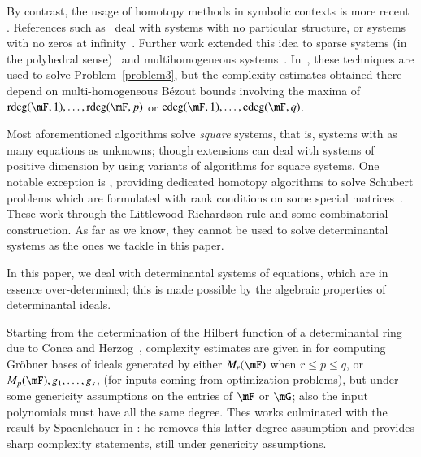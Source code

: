 By contrast, the usage of homotopy methods in symbolic contexts is
more recent%
. References such
as~\cite{HeKrPuSaWa99,BoMaWaWa04} deal with systems with no particular
structure, or systems with no zeros at infinity~\cite{PaSa04}.
Further work extended this idea to sparse systems (in the polyhedral
sense)~\cite{JeMaSoWa09,HeJeSa10,HeJeSa13,HeJeSa14} and
multihomogeneous systems~\cite{HeJeSaSo02,SaSc16}.  In~\cite{SaSc16},
these techniques are used to solve Problem~\eqref{problem3}, but the
complexity estimates obtained there depend on multi-homogeneous
B\'ezout bounds involving the maxima of $\rdeg(\mF, 1), \ldots,
\rdeg(\mF, p)$ or $\cdeg(\mF,1), \ldots, \cdeg(\mF, q)$.

Most aforementioned algorithms solve {\em square} systems, that is, systems with
as many equations as unknowns; though extensions can deal with systems of
positive dimension by using variants of algorithms for square systems. One
notable exception is \cite{SVV10}, providing dedicated homotopy algorithms to
solve Schubert problems which are formulated with rank conditions on some
special matrices~\cite{LDSVV18}. These work through the Littlewood Richardson
rule and some combinatorial construction. As far as we know, they cannot be used
to solve determinantal systems as the ones we tackle in this paper.

In this paper, we deal with determinantal
systems of equations, which are in essence over-determined; this is
made possible by the algebraic properties of determinantal ideals.

Starting from the determination of the Hilbert function of a determinantal ring
due to Conca and Herzog~\cite{CH94}, complexity estimates are given in
\cite{FSS13,FSS12} for computing Gr\"obner bases of ideals generated by either
$M_r(\mF)$ when $r\leq p\leq q$, or $M_{p}(\mF),g_1,\dots,g_s$, (for inputs
coming from optimization problems), but under some genericity assumptions on the
entries of $\mF$ or $\mG$; also the input polynomials must have all the same
degree. Thes works culminated with the result by Spaenlehauer in \cite{Spa14}:
he removes this latter degree assumption and provides sharp complexity
statements, still under genericity assumptions.


